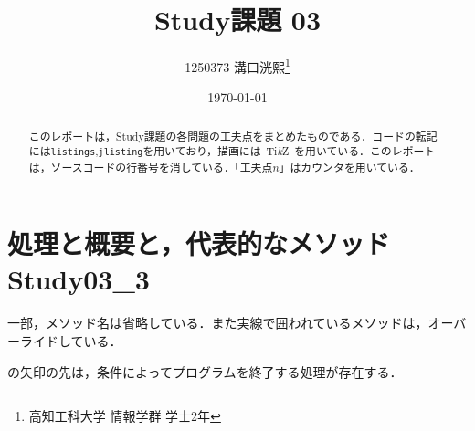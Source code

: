 \documentclass[a4j,11pt]{jsarticle}
\title{\vspace{0cm}Study課題 03}
\author{1250373 溝口洸熙\thanks{高知工科大学 情報学群 学士2年}}
\date{\today}
\begin{document}
\maketitle
\begin{abstract}
    このレポートは，Study課題の各問題の工夫点をまとめたものである．コードの転記には\verb|listings|,\verb|jlisting|を用いており，描画には\ Ti\emph{k}\normalfont Z\ を用いている．このレポートは，ソースコードの行番号を消している．「工夫点$n$」はカウンタを用いている．
\end{abstract}
\section*{処理と概要と，代表的なメソッド Study03\_3}
\scriptsize 一部，メソッド名は省略している．また実線で囲われているメソッドは，オーバーライドしている．\par
{}の矢印の先は，条件によってプログラムを終了する処理が存在する．\normalsize
\end{document}
